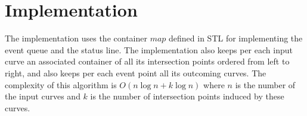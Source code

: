 \section{Implementation}

The implementation uses the container $map$ defined in STL for
implementing the event queue and the status line. The implementation
also keeps per each input curve an associated container of all its
intersection points ordered from left to right, and also keeps per
each event point all its outcoming curves. The complexity of this
algorithm is $O(n\log{n} + k\log{n})$ where $n$ is the number of the input
curves and $k$ is the number of intersection points induced by these
curves.
